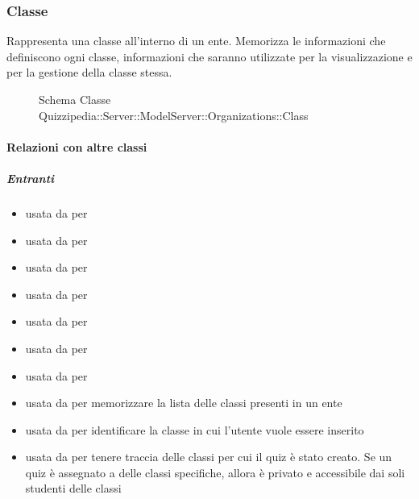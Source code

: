 \subsubsection{Classe }
Rappresenta una classe all'interno di un ente. Memorizza le informazioni che definiscono ogni classe,
informazioni che saranno utilizzate per la visualizzazione e per la gestione della classe stessa.
\begin{figure}[H]
\centering
\noindent{}
\caption[Schema Classe Class]{Schema Classe Quizzipedia::Server::ModelServer::Organizations::Class}
\end{figure}
\paragraph{Relazioni con altre classi}
\subparagraph{Entranti}
\begin{itemize}
\item usata da  per 
\item usata da  per 
\item usata da  per 
\item usata da  per 
\item usata da  per 
\item usata da  per 
\item usata da  per 
\item usata da  per memorizzare la lista
delle classi presenti in un ente
\item usata da  per identificare la classe
in cui l'utente vuole essere inserito
\item usata da  per tenere traccia delle classi per
cui il quiz è stato creato. Se un quiz è assegnato a delle classi specifiche, allora è privato e
accessibile dai soli studenti delle classi
\end{itemize}
